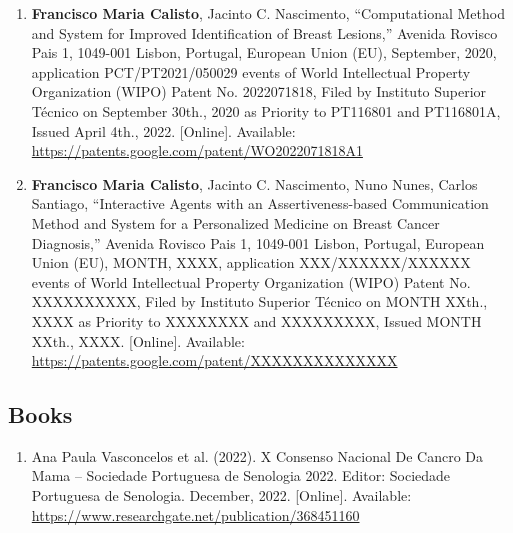 \begin{enumerate}
\item {\bf Francisco Maria Calisto}, Jacinto C. Nascimento, ``Computational Method and System for Improved Identification of Breast Lesions,'' Avenida Rovisco Pais 1, 1049-001 Lisbon, Portugal, European Union (EU), September, 2020, application PCT/PT2021/050029 events of World Intellectual Property Organization (WIPO) Patent No. 2022071818, Filed by Instituto Superior T\'{e}cnico on September 30th., 2020 as Priority to PT116801 and PT116801A, Issued April 4th., 2022. [Online]. Available: \href{https://patents.google.com/patent/WO2022071818A1}{https://patents.google.com/patent/WO2022071818A1}
\item {\bf Francisco Maria Calisto}, Jacinto C. Nascimento, Nuno Nunes, Carlos Santiago, ``Interactive Agents with an Assertiveness-based Communication Method and System for a Personalized Medicine on Breast Cancer Diagnosis,'' Avenida Rovisco Pais 1, 1049-001 Lisbon, Portugal, European Union (EU), MONTH, XXXX, application XXX/XXXXXX/XXXXXX events of World Intellectual Property Organization (WIPO) Patent No. XXXXXXXXXX, Filed by Instituto Superior T\'{e}cnico on MONTH XXth., XXXX as Priority to XXXXXXXX and XXXXXXXXX, Issued MONTH XXth., XXXX. [Online]. Available: \href{https://patents.google.com/patent/XXXXXXXXXXXXXX}{https://patents.google.com/patent/XXXXXXXXXXXXXX}
\end{enumerate}

\subsection{Books}
\label{sec:chap00100604}

\begin{enumerate}
\item Ana Paula Vasconcelos et al. (2022). X Consenso Nacional De Cancro Da Mama -- Sociedade Portuguesa de Senologia 2022. Editor: Sociedade Portuguesa de Senologia. December, 2022. [Online]. Available: \href{https://www.researchgate.net/publication/368451160}{https://www.researchgate.net/publication/368451160}
\end{enumerate}
